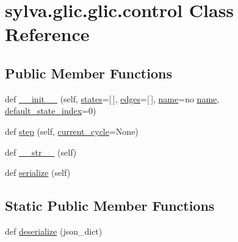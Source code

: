 \hypertarget{classsylva_1_1glic_1_1glic_1_1control}{}\section{sylva.\+glic.\+glic.\+control Class Reference}
\label{classsylva_1_1glic_1_1glic_1_1control}
\subsection*{Public Member Functions}
\begin{DoxyCompactItemize}
\item 
def \hyperlink{classsylva_1_1glic_1_1glic_1_1control_a85d706a6833a83aa424d631d85368099}{\+\_\+\+\_\+init\+\_\+\+\_\+} (self, \hyperlink{classsylva_1_1glic_1_1glic_1_1control_a392a1e20052ef15fa96049f9b201be02}{states}=\mbox{[}$\,$\mbox{]}, \hyperlink{classsylva_1_1glic_1_1glic_1_1control_ae0839083f2b17473598890c7b4690e4f}{edges}=\mbox{[}$\,$\mbox{]}, \hyperlink{classsylva_1_1glic_1_1glic_1_1control_a95f657f58c1799fe7004653fe77ce106}{name}=\textquotesingle{}no \hyperlink{classsylva_1_1glic_1_1glic_1_1control_a95f657f58c1799fe7004653fe77ce106}{name}\textquotesingle{}, \hyperlink{classsylva_1_1glic_1_1glic_1_1control_a7c5053b405b4811c446caa027cd29d7e}{default\+\_\+state\+\_\+index}=0)
\item 
def \hyperlink{classsylva_1_1glic_1_1glic_1_1control_aea52fc110901323d58833de74918965e}{step} (self, \hyperlink{classsylva_1_1glic_1_1glic_1_1control_a1e5f2d48e2bfafe60f1891e0dcb1d98a}{current\+\_\+cycle}=None)
\item 
def \hyperlink{classsylva_1_1glic_1_1glic_1_1control_a930531b0935008d702bf22e2307283c6}{\+\_\+\+\_\+str\+\_\+\+\_\+} (self)
\item 
def \hyperlink{classsylva_1_1glic_1_1glic_1_1control_a5d7147d7ce52b8f9e3e96f3dfcba672f}{serialize} (self)
\end{DoxyCompactItemize}
\subsection*{Static Public Member Functions}
\begin{DoxyCompactItemize}
\item 
def \hyperlink{classsylva_1_1glic_1_1glic_1_1control_aee8d917ad164289a074b54ddd2b7615c}{deserialize} (json\+\_\+dict)
\end{DoxyCompactItemize}

